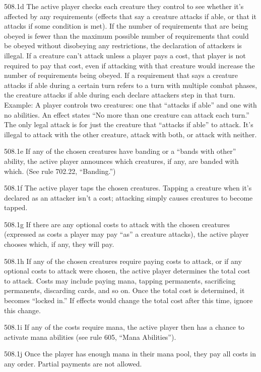 508.1d The active player checks each creature they control to see whether it’s affected by any requirements (effects that say a creature attacks if able, or that it attacks if some condition is met). If the number of requirements that are being obeyed is fewer than the maximum possible number of requirements that could be obeyed without disobeying any restrictions, the declaration of attackers is illegal. If a creature can’t attack unless a player pays a cost, that player is not required to pay that cost, even if attacking with that creature would increase the number of requirements being obeyed. If a requirement that says a creature attacks if able during a certain turn refers to a turn with multiple combat phases, the creature attacks if able during each declare attackers step in that turn.
Example: A player controls two creatures: one that “attacks if able” and one with no abilities. An effect states “No more than one creature can attack each turn.” The only legal attack is for just the creature that “attacks if able” to attack. It’s illegal to attack with the other creature, attack with both, or attack with neither.

508.1e If any of the chosen creatures have banding or a “bands with other” ability, the active player announces which creatures, if any, are banded with which. (See rule 702.22, “Banding.”)

508.1f The active player taps the chosen creatures. Tapping a creature when it’s declared as an attacker isn’t a cost; attacking simply causes creatures to become tapped.

508.1g If there are any optional costs to attack with the chosen creatures (expressed as costs a player may pay “as” a creature attacks), the active player chooses which, if any, they will pay.

508.1h If any of the chosen creatures require paying costs to attack, or if any optional costs to attack were chosen, the active player determines the total cost to attack. Costs may include paying mana, tapping permanents, sacrificing permanents, discarding cards, and so on. Once the total cost is determined, it becomes “locked in.” If effects would change the total cost after this time, ignore this change.

508.1i If any of the costs require mana, the active player then has a chance to activate mana abilities (see rule 605, “Mana Abilities”).

508.1j Once the player has enough mana in their mana pool, they pay all costs in any order. Partial payments are not allowed.


